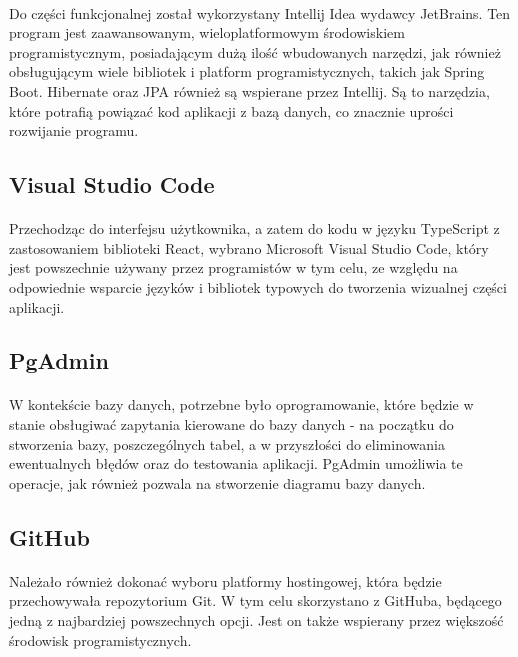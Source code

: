 \paragraph{}
Do części funkcjonalnej został wykorzystany Intellij Idea wydawcy JetBrains. Ten program jest zaawansowanym, wieloplatformowym środowiskiem programistycznym, posiadającym dużą ilość wbudowanych narzędzi, jak również obsługującym wiele bibliotek i platform programistycznych, takich jak Spring Boot. Hibernate oraz JPA również są wspierane przez Intellij. Są to narzędzia, które potrafią powiązać kod aplikacji z bazą danych, co znacznie uprości rozwijanie programu.

\subsection{Visual Studio Code}
\paragraph{}
Przechodząc do interfejsu użytkownika, a zatem do kodu w języku TypeScript z zastosowaniem biblioteki React, wybrano Microsoft Visual Studio Code, który jest powszechnie używany przez programistów w tym celu, ze względu na odpowiednie wsparcie języków i bibliotek typowych do tworzenia wizualnej części aplikacji. 

\subsection{PgAdmin}
\paragraph{}
W kontekście bazy danych, potrzebne było oprogramowanie, które będzie w stanie obsługiwać zapytania kierowane do bazy danych - na początku do stworzenia bazy, poszczególnych tabel, a w przyszłości do eliminowania ewentualnych błędów oraz do testowania aplikacji. PgAdmin umożliwia te operacje, jak również pozwala na stworzenie diagramu bazy danych.

\subsection{GitHub}
\paragraph{}
Należało również dokonać wyboru platformy hostingowej, która będzie przechowywała repozytorium Git. W tym celu skorzystano z GitHuba, będącego jedną z najbardziej powszechnych opcji. Jest on także wspierany przez większość środowisk programistycznych.

